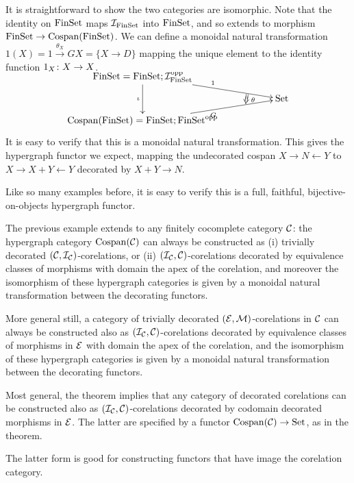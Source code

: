 \begin{example}
  It is straightforward to show the two categories are isomorphic. Note that the
  identity on $\mathrm{FinSet}$ maps $\mathcal I_{\mathrm{FinSet}}$ into $\mathrm{FinSet}$, and so extends to
  morphism $\mathrm{FinSet} \to \operatorname{{Cospan}}(\mathrm{FinSet})$. We can define a monoidal natural
  transformation $1(X) =1 \stackrel{\theta_X}\to GX = \{X \to D\}$ mapping the
  unique element to the identity function $1_X{\colon} X \to X$.
  \[
    \xymatrixrowsep{2ex}
    \xymatrix{
      \FinSet = \FinSet; \mc I_{\FinSet}^\opp \ar[dd]_{\iota} \ar[drr]^1  \\
      &\twocell \omit{_\:\theta}& \Set \\
      \cospan(\FinSet) = \FinSet; \FinSet^\opp \ar[urr]_{G} 
    }
  \]
  It is easy to verify that this is a monoidal natural transformation. This
  gives the hypergraph functor we expect, mapping the undecorated cospan $X \to
  N \leftarrow Y$ to $X \to X+Y \leftarrow Y$ decorated by $X+Y \to N$. 

  Like so many examples before, it is easy to verify this is a full, faithful,
  bijective-on-objects hypergraph functor.
\end{example}

\begin{example}
  The previous example extends to any finitely cocomplete category $\mathcal C$: the
  hypergraph category $\operatorname{{Cospan}}(\mathcal C)$ can always be constructed as (i)
  trivially decorated $(\mathcal C, \mathcal I_{\mathcal C})$-corelations, or (ii) $(\mathcal I_{\mathcal
  C}, \mathcal C)$-corelations decorated by equivalence classes of morphisms with
  domain the apex of the corelation, and moreover the isomorphism of these
  hypergraph categories is given by a monoidal natural transformation between
  the decorating functors.

  More general still, a category of trivially decorated $(\mathcal E, \mathcal
  M)$-corelations in $\mathcal C$ can always be constructed also as $(\mathcal I_{\mathcal C},
  \mathcal C)$-corelations decorated by equivalence classes of morphisms in $\mathcal E$
  with domain the apex of the corelation, and the isomorphism of these
  hypergraph categories is given by a monoidal natural transformation between
  the decorating functors.

  Most general, the theorem implies that any category of decorated
  corelations can be constructed also as $(\mathcal I_{\mathcal C}, \mathcal C)$-corelations
  decorated by codomain decorated morphisms in $\mathcal E$. The latter are specified
  by a functor $\operatorname{{Cospan}}(\mathcal C) \to \mathrm{Set}$, as in the theorem.

  The latter form is good for constructing functors that have image the
  corelation category.
\end{example}

